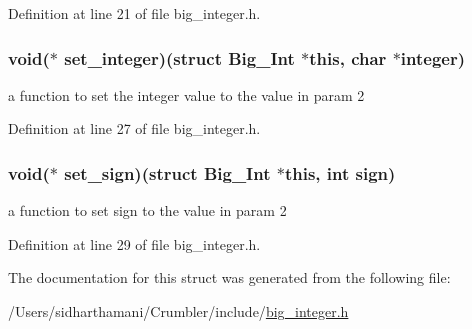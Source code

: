Definition at line 21 of file big\-\_\-integer.\-h.

\hypertarget{struct_big___int_a34a65fb8d8cc2acf5a14a18c420ee774}{
\subsubsection[{set\-\_\-integer}]{\setlength{\rightskip}{0pt plus 5cm}void($\ast$ set\-\_\-integer)(struct {\bf Big\-\_\-\-Int} $\ast$this, char $\ast${\bf integer})}}\label{struct_big___int_a34a65fb8d8cc2acf5a14a18c420ee774}
a function to set the integer value to the value in param 2 

Definition at line 27 of file big\-\_\-integer.\-h.

\hypertarget{struct_big___int_a70cf790b3af136aad25fa028cde3e801}{
\subsubsection[{set\-\_\-sign}]{\setlength{\rightskip}{0pt plus 5cm}void($\ast$ set\-\_\-sign)(struct {\bf Big\-\_\-\-Int} $\ast$this, int sign)}}\label{struct_big___int_a70cf790b3af136aad25fa028cde3e801}
a function to set sign to the value in param 2 

Definition at line 29 of file big\-\_\-integer.\-h.



The documentation for this struct was generated from the following file\-:\begin{DoxyCompactItemize}
\item 
/\-Users/sidharthamani/\-Crumbler/include/\hyperlink{big__integer_8h}{big\-\_\-integer.\-h}\end{DoxyCompactItemize}
